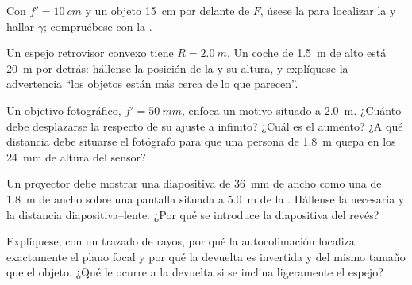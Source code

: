 \begin{exercise}[$\star$]\label{exo:b1:mirrors-thin-lenses:4}
Con $f' = \qty{10}{cm}$ y un objeto \qty{15}{cm} por delante de $F$,
úsese la  para localizar la  y hallar $\gamma$;
compruébese con la .
\end{exercise}

\begin{exercise}[$\star\star$]\label{exo:b1:mirrors-thin-lenses:5}
Un espejo retrovisor convexo tiene $R = \qty{2.0}{m}$. Un coche de
\qty{1.5}{m} de alto está \qty{20}{m} por detrás: hállense la posición de
la  y su altura, y explíquese la advertencia ``los objetos están más
cerca de lo que parecen''.
\end{exercise}

\begin{exercise}[$\star\star$]\label{exo:b1:mirrors-thin-lenses:6}
Un objetivo fotográfico, $f' = \qty{50}{mm}$, enfoca un motivo situado a
\qty{2.0}{m}. ¿Cuánto debe desplazarse la  respecto de su ajuste a
infinito? ¿Cuál es el aumento? ¿A qué distancia debe situarse el fotógrafo
para que una persona de \qty{1.8}{m} quepa en los \qty{24}{mm} de altura
del sensor?
\end{exercise}

\begin{exercise}[$\star\star$]\label{exo:b1:mirrors-thin-lenses:7}
Un proyector debe mostrar una diapositiva de \qty{36}{mm} de ancho como
una  de \qty{1.8}{m} de ancho sobre una pantalla situada a
\qty{5.0}{m} de la . Hállense la  necesaria y la
distancia diapositiva--lente. ¿Por qué se introduce la diapositiva del revés?
\end{exercise}

\begin{exercise}[$\star\star$]\label{exo:b1:mirrors-thin-lenses:8}
Explíquese, con un trazado de rayos, por qué la autocolimación localiza
exactamente el plano focal y por qué la  devuelta es invertida y del
mismo tamaño que el objeto. ¿Qué le ocurre a la  devuelta si se
inclina ligeramente el espejo?
\end{exercise}

